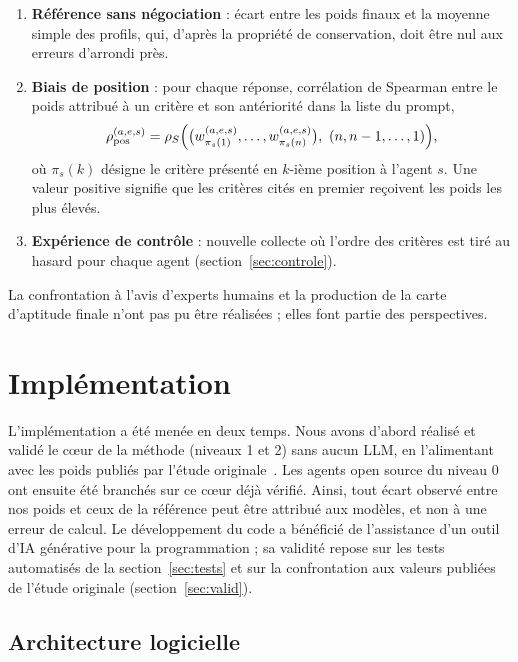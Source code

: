 \documentclass[11pt,a4paper]{article}
\begin{document}
\begin{enumerate}[label=\arabic*.,start=0,leftmargin=*]
  \item \textbf{Référence sans négociation} : écart entre les poids finaux et la moyenne simple des profils, qui, d'après la propriété de conservation, doit être nul aux erreurs d'arrondi près.
  \item \textbf{Biais de position} : pour chaque réponse, corrélation de Spearman entre le poids attribué à un critère et son antériorité dans la liste du prompt,
  \begin{equation}\label{eq:rhopos}
    \rho_{\mathrm{pos}}^{(a,e,s)}=\rho_S\Bigl(\bigl(w^{(a,e,s)}_{\pi_s(1)},\dots,w^{(a,e,s)}_{\pi_s(n)}\bigr),\ (n,n-1,\dots,1)\Bigr),
  \end{equation}
  où $\pi_s(k)$ désigne le critère présenté en $k$-ième position à l'agent $s$. Une valeur positive signifie que les critères cités en premier reçoivent les poids les plus élevés.
  \item \textbf{Expérience de contrôle} : nouvelle collecte où l'ordre des critères est tiré au hasard pour chaque agent (section~\ref{sec:controle}).
\end{enumerate}
La confrontation à l'avis d'experts humains et la production de la carte d'aptitude finale n'ont pas pu être réalisées ; elles font partie des perspectives.

\section{Implémentation}\label{sec:impl}

L'implémentation a été menée en deux temps. Nous avons d'abord réalisé et validé le cœur de la méthode (niveaux 1 et 2) sans aucun LLM, en l'alimentant avec les poids publiés par l'étude originale~\cite{masllms}. Les agents open source du niveau 0 ont ensuite été branchés sur ce cœur déjà vérifié. Ainsi, tout écart observé entre nos poids et ceux de la référence peut être attribué aux modèles, et non à une erreur de calcul. Le développement du code a bénéficié de l'assistance d'un outil d'IA générative pour la programmation ; sa validité repose sur les tests automatisés de la section~\ref{sec:tests} et sur la confrontation aux valeurs publiées de l'étude originale (section~\ref{sec:valid}).

\subsection{Architecture logicielle}
\end{document}
